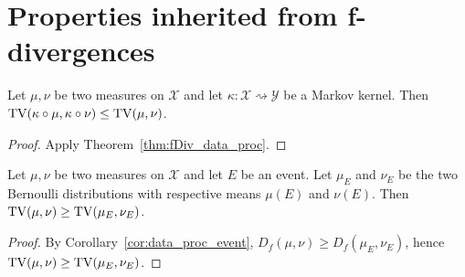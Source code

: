 \section{Properties inherited from f-divergences}

\begin{theorem}
  \label{thm:tv_data_proc}
  Let $\mu, \nu$ be two measures on $\mathcal X$ and let $\kappa : \mathcal X \rightsquigarrow \mathcal Y$ be a Markov kernel.
  Then $\operatorname{TV}(\kappa \circ \mu, \kappa \circ \nu) \le \operatorname{TV}(\mu, \nu)$.
\end{theorem}

\begin{proof}
Apply Theorem~\ref{thm:fDiv_data_proc}.
\end{proof}

\begin{lemma}
  \label{lem:tv_data_proc_event}
  Let $\mu, \nu$ be two measures on $\mathcal X$ and let $E$ be an event. Let $\mu_E$ and $\nu_E$ be the two Bernoulli distributions with respective means $\mu(E)$ and $\nu(E)$.
  Then $\operatorname{TV}(\mu, \nu) \ge \operatorname{TV}(\mu_E, \nu_E)$.
\end{lemma}

\begin{proof}
By Corollary~\ref{cor:data_proc_event}, $D_f(\mu, \nu) \ge D_f(\mu_E, \nu_E)$, hence $\operatorname{TV}(\mu, \nu) \ge \operatorname{TV}(\mu_E, \nu_E)$.
\end{proof}
